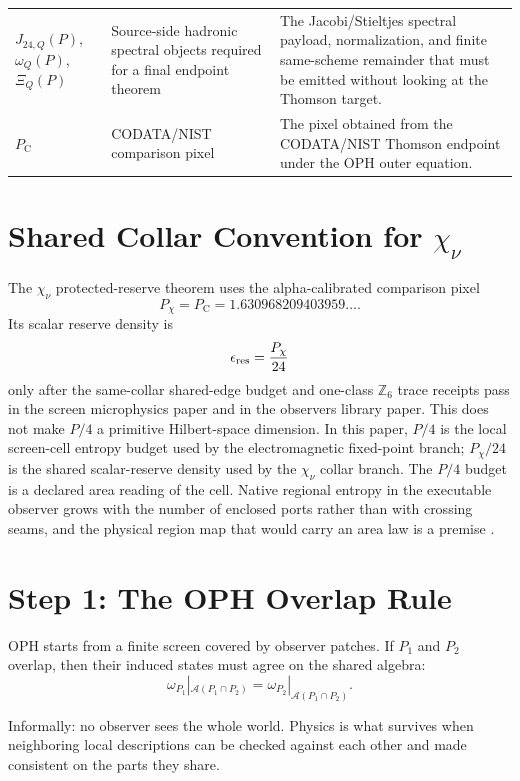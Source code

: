 \documentclass[11pt]{article}
\theoremstyle{remark}
\newcommand{\A}{\mathcal A}
\newcommand{\Ppub}{P_{\mathrm C}}
\begin{document}
\begin{longtable}{@{}L{0.20\textwidth}L{0.32\textwidth}L{0.38\textwidth}@{}}
\(J_{24,Q}(P)\), \(\omega_Q(P)\), \(\Xi_Q(P)\) & Source-side hadronic spectral objects required for a final endpoint theorem & The Jacobi/Stieltjes spectral payload, normalization, and finite same-scheme remainder that must be emitted without looking at the Thomson target. \\
\(\Ppub\) & CODATA/NIST comparison pixel & The pixel obtained from the CODATA/NIST Thomson endpoint under the OPH outer equation. \\
\bottomrule
\end{longtable}

\section{Shared Collar Convention for \(\chi_\nu\)}

The \(\chi_\nu\) protected-reserve theorem uses the alpha-calibrated comparison
pixel
\[
P_\chi=P_{\mathrm C}=1.630968209403959\ldots .
\]
Its scalar reserve density is
\[
\epsilon_{\rm res}=\frac{P_\chi}{24}
\]
only after the same-collar shared-edge budget and one-class \(\mathbb Z_6\)
trace receipts pass in the screen microphysics paper and in the observers library paper.  This
does not make \(P/4\) a primitive Hilbert-space dimension.  In this paper,
\(P/4\) is the local screen-cell entropy budget used by the electromagnetic
fixed-point branch; \(P_\chi/24\) is the shared scalar-reserve density used by the
\(\chi_\nu\) collar branch. The \(P/4\) budget is a declared area reading of the cell.
Native regional entropy in the executable observer grows with the number of enclosed ports
rather than with crossing seams, and the physical region map that would carry an area law is a
premise \cite{ophentropy}.

\section{Step 1: The OPH Overlap Rule}

OPH starts from a finite screen covered by observer patches. If \(P_1\) and \(P_2\) overlap, then their induced states must agree on the shared algebra:
\begin{equation}
\omega_{P_1}|_{\A(P_1\cap P_2)}
=
\omega_{P_2}|_{\A(P_1\cap P_2)}.
\label{eq:overlap}
\end{equation}

Informally: no observer sees the whole world. Physics is what survives when neighboring local descriptions can be checked against each other and made consistent on the parts they share.
\end{document}
